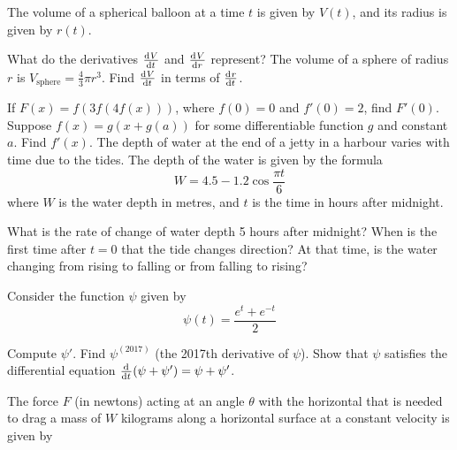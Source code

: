 \begin{questions}
  \question The volume of a spherical balloon at a time $ t $ is given by $ V(t) $, and its radius is given by $ r(t) $.
    \begin{parts}
      \parA What do the derivatives $ \od{V}{t} $ and $ \od{V}{r} $ represent?
      \parM The volume of a sphere of radius $ r $ is $ V_\text{sphere} = \frac{4}{3} \pi r^3 $. Find $ \od{V}{t} $ in terms of $ \od{r}{t} $.
    \end{parts}
  \questioM If $ F(x) = f(3f(4f(x))) $, where $ f(0) = 0 $ and $ f'(0) = 2 $, find $ F'(0) $.
  \questioA Suppose $ f(x) = g(x + g(a)) $ for some differentiable function $ g $ and constant $ a $. Find $ f'(x) $.
  \question The depth of water at the end of a jetty in a harbour varies with time due to the tides. The depth
            of the water is given by the formula
            \begin{displaymath}
              W = 4.5 - 1.2 \cos \frac{\pi t}{6}
            \end{displaymath}
            where $ W $ is the water depth in metres, and $ t $ is the time in hours after midnight.
    \begin{parts}
      \parA What is the rate of change of water depth 5 hours after midnight?
      \parM When is the first time after $ t = 0 $ that the tide changes direction?
      \parE At that time, is the water changing from rising to falling or from falling to rising?
    \end{parts}
  \question Consider the function $ \psi $ given by
            \begin{displaymath}
              \psi(t) = \frac{e^t + e^{-t}}{2}
            \end{displaymath}
    \begin{parts}
      \parA Compute $ \psi' $.
      \parM Find $ \psi^{(2017)} $ (the 2017th derivative of $ \psi $).
      \parA Show that $ \psi $ satisfies the differential equation $ \od{}{t}(\psi + \psi') = \psi + \psi' $.
    \end{parts}
  \question The force $ F $ (in newtons) acting at an angle $ \theta $ with the horizontal that is needed
            to drag a mass of $ W $ kilograms along a horizontal surface at a constant velocity is given by
            \begin{displaymath}

\end{displaymath}
\end{questions}

